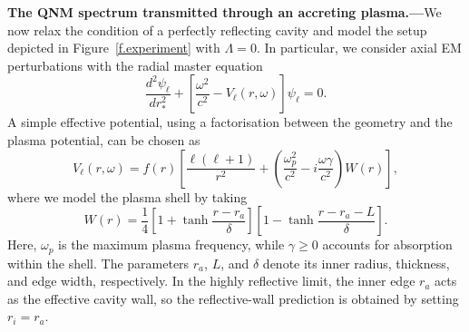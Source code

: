 \documentclass[prd,aps,twocolumn,amsfonts,showpacs,superscriptaddress,preprintnumbers,nofootinbib]{revtex4-2}
\begin{document}

{\bf The QNM spectrum transmitted through an accreting plasma.---}We now relax the condition of a perfectly reflecting cavity and model the setup depicted in Figure~\ref{f.experiment} with $\Lambda=0$. In particular, we consider axial EM perturbations with the radial master equation
\begin{equation}\label{e.apple_on_tree}
    \frac{d^2\psi_\ell}{dr_*^2}  +\left[\frac{\omega^2}{c^2}-V_\ell(r,\omega)\right]\psi_\ell=0.
\end{equation}
A simple effective potential, using a factorisation between the geometry and the plasma potential, can be chosen as  
\begin{equation}\label{e.rozok}
    V_\ell(r,\omega)
    =f(r)\left[
    \frac{\ell(\ell+1)}{r^2}
    +\left(\frac{\omega_p^2}{c^2}-i\frac{\omega\gamma}{c^2}\right)W(r)
    \right],
\end{equation}
where we model the plasma shell by taking 
\begin{equation}\label{e.apple_farmer}
    W(r) = 
    \frac{1}{4}
    \left[1+\tanh\frac{r-r_a}{\delta} \right] \left[1-\tanh\frac{r-r_a-L}{\delta}
    \right].
\end{equation}
Here, $\omega_p$ is the maximum plasma frequency, while $\gamma\geq0$ accounts for absorption within the shell. The parameters $r_a$, $L$, and $\delta$ denote its inner radius, thickness, and edge width, respectively. In the highly reflective limit, the inner edge $r_a$ acts as the effective cavity wall, so the reflective-wall prediction is obtained by setting $r_i=r_a$. 
\end{document}
